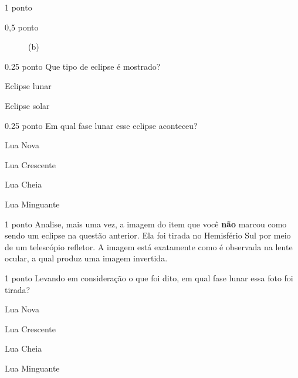 \documentclass{../lista}
\begin{document}
\begin{questao}{1 ponto}
\begin{pergunta}{0,5 ponto}
\begin{multicols}{2}
\begin{figure}[H]
					\captionsetup{labelformat=empty}
					\caption{(b)}
				\end{figure}
			\end{multicols}
		\end{pergunta}
		\begin{pergunta}{0.25 ponto}
			Que tipo de eclipse é mostrado?
			\begin{alternativas}
				\item Eclipse lunar
				\item Eclipse solar
			\end{alternativas}
		\end{pergunta}
		\begin{pergunta}{0.25 ponto}
			Em qual fase lunar esse eclipse aconteceu?
			\begin{alternativas}
				\item Lua Nova
				\item Lua Crescente
				\item Lua Cheia
				\item Lua Minguante
			\end{alternativas}
		\end{pergunta}
	\end{questao}

	\begin{questao}{1 ponto}
		Analise, mais uma vez, a imagem do item que você \textbf{não} marcou como sendo um eclipse na questão anterior. Ela foi tirada no Hemisfério Sul por meio de um telescópio refletor. A imagem está exatamente como é observada na lente ocular, a qual produz uma imagem invertida.
		\begin{pergunta}{1 ponto}
			Levando em consideração o que foi dito, em qual fase lunar essa foto foi tirada?
			\begin{alternativas}
				\item Lua Nova
				\item Lua Crescente
				\item Lua Cheia
				\item Lua Minguante
			\end{alternativas}
		\end{pergunta}
	\end{questao}
\end{document}
